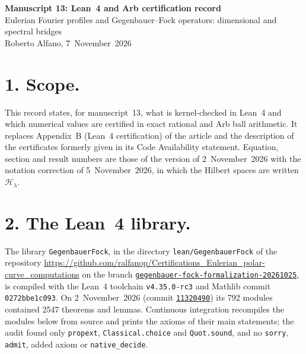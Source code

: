 \documentclass[11pt,a4paper]{article}
\newcommand{\R}{https://github.com/ralfanop/Certifications_Eulerian_polar-curve_computations}
\newcommand{\Br}{gegenbauer-fock-formalization-20261025}
\begin{document}
\begin{center}
{\Large\bfseries Manuscript 13: Lean~4 and Arb certification record}\\[6pt]
{\large Eulerian Fourier profiles and Gegenbauer--Fock operators: dimensional and spectral bridges}\\[6pt]
Roberto Alfano, 7~November~2026
\end{center}

\section*{1. Scope.}
This record states, for manuscript~13, what is kernel-checked in Lean~4 and which numerical values are certified in exact rational and Arb ball arithmetic. It replaces Appendix~B (Lean~4 certification) of the article and the description of the certificates formerly given in its Code Availability statement. Equation, section and result numbers are those of the version of 2~November~2026 with the notation correction of 5~November~2026, in which the Hilbert spaces are written $\mathcal H_\lambda$.

\section*{2. The Lean~4 library.}
The library \texttt{GegenbauerFock}, in the directory \texttt{lean/GegenbauerFock} of the repository \url{\R} on the branch \href{\R/tree/\Br}{\texttt{\Br}}, is compiled with the Lean~4 toolchain \texttt{v4.35.0-rc3} and Mathlib commit \texttt{0272bbe1c093}. On 2~November~2026 (commit \href{\R/tree/1132049025418c06f8b6f16a8e0112ab3088c4ba}{\texttt{11320490}}) its 792 modules contained 2547 theorems and lemmas. Continuous integration recompiles the modules below from source and prints the axioms of their main statements; the audit found only \texttt{propext}, \texttt{Classical.choice} and \texttt{Quot.sound}, and no \texttt{sorry}, \texttt{admit}, added axiom or \texttt{native\_decide}.
\end{document}
